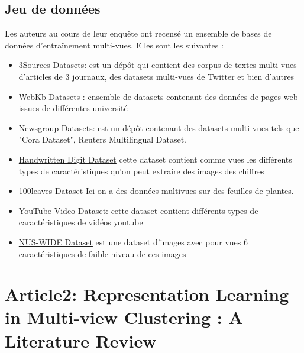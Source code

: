 \documentclass[12pt, french, latin.medieval, a4paper]{report}
\begin{document}
    	\subsection{Jeu de données}
        	Les auteurs au cours de leur enquête ont recensé un ensemble de bases de données d'entraînement multi-vues. Elles sont les suivantes :
        	\begin{itemize}
            	\item \href{http://mlg.ucd.ie/datasets/bbc.html}{3Sources Datasets}: est un dépôt qui contient des corpus de textes multi-vues d'articles de 3 journaux, des datasets multi-vues de Twitter et bien d'autres
            	\item \href{ttp://www.cs.cmu.edu/afs/cs.cmu.edu/project/theo-20/www/data/}{WebKb Datasets} : ensemble de datasets contenant des données de pages web issues de différentes université
            	\item \href{http://lig-membres.imag.fr/grimal/data.html}{Newsgroup Datasets}: est un dépôt contenant des datasets multi-vues tels que "Cora Dataset", Reuters Multilingual Dataset.
            	\item \href{http://archive.ics.uci.edu/ml/datasets/Multiple+Features}{Handwritten Digit Dataset} cette dataset contient comme vues les différents types de caractéristiques qu'on peut extraire des images des chiffres
            	\item \href{https://archive.ics.uci.edu/ml/datasets/One-hundred+plant+species+leaves+data+set}{100leaves Dataset} Ici on a des données multivues sur des feuilles de plantes.
            	\item \href{https://archive.ics.uci.edu/ml/datasets/YouTube+Multiview+Video+Games+Dataset}{YouTube Video Dataset}: cette dataset contient différents types de caractéristiques de vidéos youtube
            	\item \href{http://lms.comp.nus.edu.sg/research/NUS-WIDE.htm}{NUS-WIDE Dataset} est une dataset d'images avec pour vues 6 caractéristiques de faible niveau de ces images
        	\end{itemize}

	\section{Article2: Representation Learning in Multi-view Clustering : A Literature Review}
    
\end{document}
